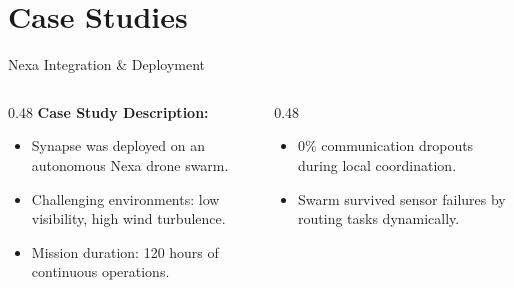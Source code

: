 \section{Case Studies}

\begin{frame}{Nexa Integration \& Deployment}
  \begin{columns}[T]
    \begin{column}{0.48\textwidth}
      \textbf{Case Study Description:}
      \begin{itemize}
        \item Synapse was deployed on an autonomous Nexa drone swarm.
        \item Challenging environments: low visibility, high wind turbulence.
        \item Mission duration: 120 hours of continuous operations.
      \end{itemize}
    \end{column}
    
    \begin{column}{0.48\textwidth}
      \begin{tcolorbox}[colback=orange!5, colframe=SynapseAmber, title=Field Insights]
        \begin{itemize}
          \item 0\% communication dropouts during local coordination.
          \item Swarm survived sensor failures by routing tasks dynamically.
        \end{itemize}
      \end{tcolorbox}
    \end{column}
  \end{columns}
\end{frame}

